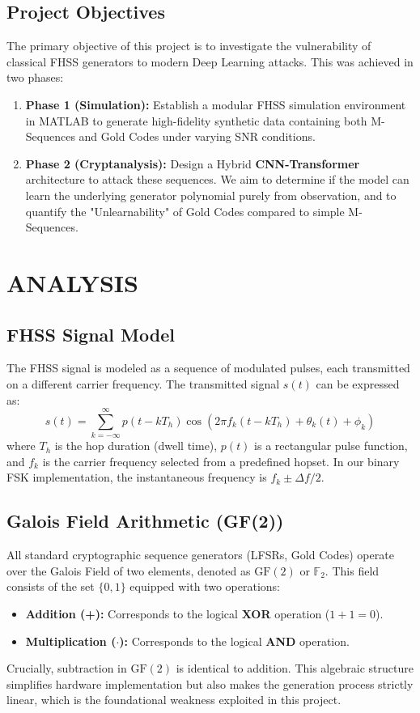 \documentclass[12pt,a4paper]{report}
\theoremstyle{plain}
\begin{document}
\section{Project Objectives}
The primary objective of this project is to investigate the vulnerability of classical FHSS generators to modern Deep Learning attacks. This was achieved in two phases:
\begin{enumerate}
    \item \textbf{Phase 1 (Simulation):} Establish a modular FHSS simulation environment in MATLAB to generate high-fidelity synthetic data containing both M-Sequences and Gold Codes under varying SNR conditions.
    \item \textbf{Phase 2 (Cryptanalysis):} Design a Hybrid \textbf{CNN-Transformer} architecture to attack these sequences. We aim to determine if the model can learn the underlying generator polynomial purely from observation, and to quantify the "Unlearnability" of Gold Codes compared to simple M-Sequences.
\end{enumerate}

\chapter{ANALYSIS}
\section{FHSS Signal Model}
The FHSS signal is modeled as a sequence of modulated pulses, each transmitted on a different carrier frequency. The transmitted signal $s(t)$ can be expressed as:
\begin{equation}
    s(t)=\sum_{k=-\infty}^{\infty}p(t-kT_{h})\cos(2\pi f_{k}(t-kT_{h})+\theta_{k}(t)+\phi_{k})
\end{equation}
where $T_{h}$ is the hop duration (dwell time), $p(t)$ is a rectangular pulse function, and $f_{k}$ is the carrier frequency selected from a predefined hopset. In our binary FSK implementation, the instantaneous frequency is $f_{k}\pm\Delta f/2$.

\section{Galois Field Arithmetic (GF(2))}
All standard cryptographic sequence generators (LFSRs, Gold Codes) operate over the Galois Field of two elements, denoted as $\text{GF}(2)$ or $\mathbb{F}_2$. This field consists of the set $\{0, 1\}$ equipped with two operations:
\begin{itemize}
    \item \textbf{Addition (+):} Corresponds to the logical \textbf{XOR} operation ($1+1=0$).
    \item \textbf{Multiplication ($\cdot$):} Corresponds to the logical \textbf{AND} operation.
\end{itemize}
Crucially, subtraction in $\text{GF}(2)$ is identical to addition. This algebraic structure simplifies hardware implementation but also makes the generation process strictly linear, which is the foundational weakness exploited in this project.
\end{document}

